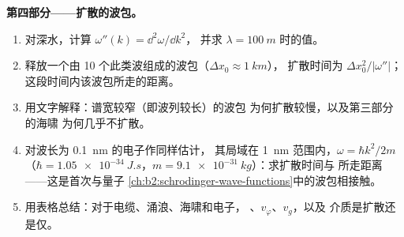 \begin{problem}
\medskip
\noindent\textbf{第四部分——扩散的波包。}
\begin{enumerate}[resume]
  \item 对深水，计算 $\omega''(k) = \dd^2\omega/\dd k^2$，
        并求 $\lambda = \qty{100}{m}$ 时的值。
  \item 释放一个由 \qty{10}{} 个此类波组成的波包（$\Delta x_0 \approx \qty{1}{km}$），
        扩散时间为 $\Delta x_0^2/|\omega''|$；
        这段时间内该波包所走的距离。
  \item 用文字解释：谱宽较窄（即波列较长）的波包
        为何扩散较慢，以及第三部分的海啸
        为何几乎不扩散。
  \item 对波长为 \qty{0.1}{nm} 的电子作同样估计，
        其局域在 \qty{1}{nm} 范围内，$\omega = \hbar k^2/2m$（$\hbar =
        \qty{1.05e-34}{J.s}$，$m = \qty{9.1e-31}{kg}$）：求扩散时间与
        所走距离——这是首次与量子
        \cref{ch:b2:schrodinger-wave-functions}中的波包相接触。
  \item 用表格总结：对于电缆、涌浪、海啸和电子，
        、$v_\varphi$、$v_g$，以及
        介质是扩散还是仅。
\end{enumerate}
\end{problem}

